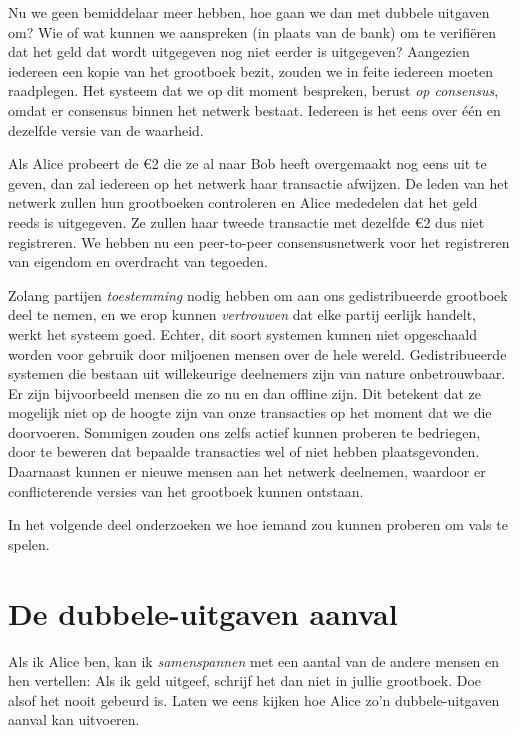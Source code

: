 Nu we geen bemiddelaar meer hebben, hoe gaan we dan met dubbele uitgaven om? Wie of wat kunnen we aanspreken (in plaats van de bank) om te verifiëren dat het geld dat wordt uitgegeven nog niet eerder is uitgegeven? Aangezien iedereen een kopie van het grootboek bezit, zouden we in feite iedereen moeten raadplegen. Het systeem dat we op dit moment bespreken, berust \textit{op consensus}, omdat er consensus binnen het netwerk bestaat. Iedereen is het eens over één en dezelfde versie van de waarheid.

Als Alice probeert de €2 die ze al naar Bob heeft overgemaakt nog eens uit te geven, dan zal iedereen op het netwerk haar transactie afwijzen. De leden van het netwerk zullen hun grootboeken controleren en Alice mededelen dat het geld reeds is uitgegeven. Ze zullen haar tweede transactie met dezelfde €2 dus niet registreren. We hebben nu een peer-to-peer consensusnetwerk voor het registreren van eigendom en overdracht van tegoeden.

Zolang partijen \textit{toestemming} nodig hebben om aan ons gedistribueerde grootboek deel te nemen, en we erop kunnen \textit{vertrouwen} dat elke partij eerlijk handelt, werkt het systeem goed. Echter, dit soort systemen kunnen niet opgeschaald worden voor gebruik door miljoenen mensen over de hele wereld. Gedistribueerde systemen die bestaan uit willekeurige deelnemers zijn van nature onbetrouwbaar. Er zijn bijvoorbeeld mensen die zo nu en dan offline zijn. Dit betekent dat ze mogelijk niet op de hoogte zijn van onze transacties op het moment dat we die doorvoeren. Sommigen zouden ons zelfs actief kunnen proberen te bedriegen, door te beweren dat bepaalde transacties wel of niet hebben plaatsgevonden. Daarnaast kunnen er nieuwe mensen aan het netwerk deelnemen, waardoor er conflicterende versies van het grootboek kunnen ontstaan.

In het volgende deel onderzoeken we hoe iemand zou kunnen proberen om vals te spelen.

\section{De dubbele-uitgaven aanval}

Als ik Alice ben, kan ik \textit{samenspannen} met een aantal van de andere mensen en hen vertellen: \textquotedbl{}Als ik geld uitgeef, schrijf het dan niet in jullie grootboek. Doe alsof het nooit gebeurd is.\textquotedbl{} Laten we eens kijken hoe Alice zo'n dubbele-uitgaven aanval kan uitvoeren.

